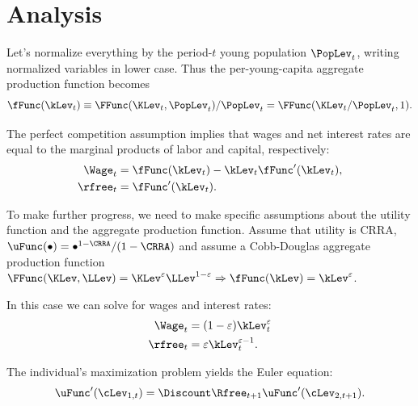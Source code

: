 \documentclass{handout}
\begin{document}
\section{Analysis}

Let's normalize everything by the period-$t$ young population $\PopLev_{t}$, 
writing normalized variables in lower case.  Thus the per-young-capita 
aggregate production function becomes 
\begin{equation}
        \fFunc(\kLev_{t}) \equiv \FFunc(\KLev_{t},\PopLev_{t})/\PopLev_{t} = \FFunc(\KLev_{t}/\PopLev_{t},1). \label{eq:fFromF}
\end{equation}

The perfect competition assumption implies that wages and net interest 
rates are equal to the marginal products of labor and capital, 
respectively: 
\begin{equation}\begin{gathered}\begin{aligned}
        \Wage_{t} & =  \fFunc(\kLev_{t}) - \kLev_{t}\fFunc^{\prime}(\kLev_{t}),
\\      \rfree_{t} & =  \fFunc^{\prime}(\kLev_{t}) \label{eq:rEqfp}.
\end{aligned}\end{gathered}\end{equation}

To make further progress, we need to make specific assumptions about 
the utility function and the aggregate production function.  Assume 
that utility is CRRA, $\uFunc(\bullet) = \bullet^{1-\CRRA}/(1-\CRRA)$ and assume a 
Cobb-Douglas aggregate production function $\FFunc(\KLev,\LLev) = \KLev^{\varepsilon}\LLev^{1-\varepsilon} \Rightarrow \fFunc(\kLev) = \kLev^{\varepsilon}$.

In this case we can solve for wages and interest rates:
\begin{equation}\begin{gathered}\begin{aligned}
        \Wage_{t} & =  (1-\varepsilon) \kLev^{\varepsilon}_{t}  \\
        \rfree_{t} & =  \varepsilon \kLev^{\varepsilon-1}_{t}.
\end{aligned}\end{gathered}\end{equation}

The individual's maximization problem yields the Euler equation:
\begin{equation}
\uFunc^{\prime}(\cLev_{1,t}) = \Discount \Rfree_{t+1} \uFunc^{\prime}(\cLev_{2,t+1}). 
\end{equation}
\end{document}
